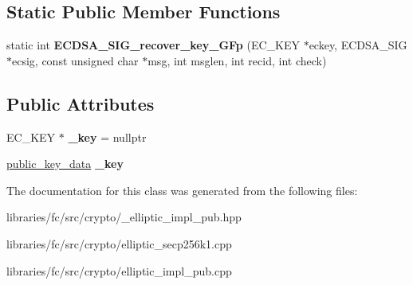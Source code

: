 \subsection*{Static Public Member Functions}
\begin{DoxyCompactItemize}
\item 
\mbox{\label{classfc_1_1ecc_1_1detail_1_1public__key__impl_a9b79e279e77c8ec1227e3bcb596cf74a}} 
static int {\bfseries E\+C\+D\+S\+A\+\_\+\+S\+I\+G\+\_\+recover\+\_\+key\+\_\+\+G\+Fp} (E\+C\+\_\+\+K\+EY $\ast$eckey, E\+C\+D\+S\+A\+\_\+\+S\+IG $\ast$ecsig, const unsigned char $\ast$msg, int msglen, int recid, int check)
\end{DoxyCompactItemize}
\subsection*{Public Attributes}
\begin{DoxyCompactItemize}
\item 
\mbox{\label{classfc_1_1ecc_1_1detail_1_1public__key__impl_a0126aa413164230b009ade93e8d260c2}} 
E\+C\+\_\+\+K\+EY $\ast$ {\bfseries \+\_\+key} = nullptr
\item 
\mbox{\label{classfc_1_1ecc_1_1detail_1_1public__key__impl_a43b5ef8d2fa49686a315d6655aa019a6}} 
\mbox{\hyperlink{classfc_1_1array}{public\+\_\+key\+\_\+data}} {\bfseries \+\_\+key}
\end{DoxyCompactItemize}


The documentation for this class was generated from the following files\+:\begin{DoxyCompactItemize}
\item 
libraries/fc/src/crypto/\+\_\+elliptic\+\_\+impl\+\_\+pub.\+hpp\item 
libraries/fc/src/crypto/elliptic\+\_\+secp256k1.\+cpp\item 
libraries/fc/src/crypto/elliptic\+\_\+impl\+\_\+pub.\+cpp\end{DoxyCompactItemize}
